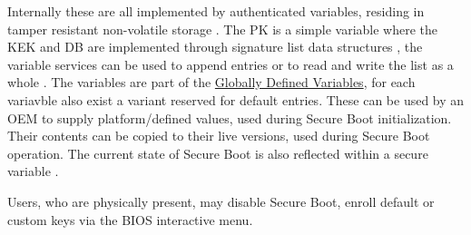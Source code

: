 Internally these are all implemented by authenticated variables, residing in tamper resistant non-volatile storage \cite[32.3]{uefi-spec}.
The \ac{PK} is a simple variable where the \ac{KEK} and \ac{DB} are implemented through signature list data structures \cite[32.4.1]{uefi-spec}, the variable services can be used to append entries or to read and write the list as a whole \cite[32.3.5 and 32.5.3]{uefi-spec}.
The variables are part of the \hyperref[sec:uefi-pi:uefi:variables]{Globally Defined Variables}, for each variavble also exist a variant reserved for default entries. These can be used by an \ac{OEM} to supply platform\-/defined values, used during Secure Boot initialization.
Their contents can be copied to their live versions, used during Secure Boot operation.
The current state of Secure Boot is also reflected within a secure variable \cite[3.3]{uefi-spec}.

Users, who are physically present, may disable Secure Boot, enroll default or custom keys via the \ac{BIOS} interactive menu. 

\cite[32.5.3.2]{uefi-spec}


